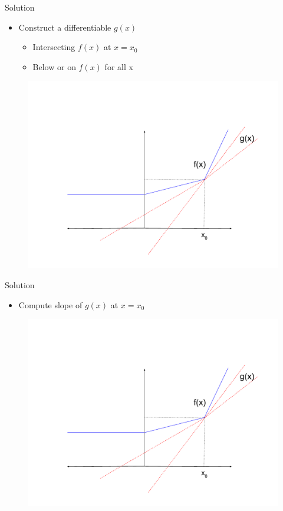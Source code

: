 \documentclass{beamer}
\begin{document}
\begin{frame}{Solution}

\begin{itemize}
\item Construct a differentiable $g(x)$ 
\begin{itemize}
    \item Intersecting $f(x)$ at $x = x_0$
    \pause
\item Below or on $f(x)$ for all x
\end{itemize}
\end{itemize}
\begin{figure}
    \centering
    \includegraphics[scale = 0.25]{subgradient_2.pdf}
    \label{fig:my_label}
\end{figure}
\end{frame}

\begin{frame}{Solution}

\begin{itemize}
\item Compute slope of $g(x)$ at $x = x_0$
\end{itemize}
\begin{figure}
    \centering
    \includegraphics[scale = 0.25]{subgradient_2.pdf}
    
    \label{fig:my_label}
\end{figure}
\end{frame}
\end{document}
